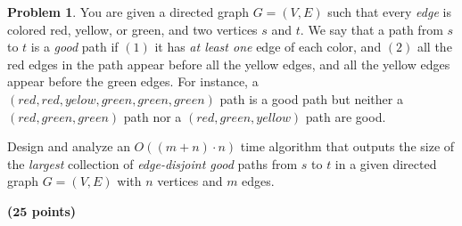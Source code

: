 \documentclass{article}
\theoremstyle{definition}
\newtheorem{problem}{Problem}
\newcommand{\grade}[1]{\hfill{\textbf{($\mathbf{#1}$ points)}}}
\begin{document}
\newpage




\newpage



\begin{problem}\label{flow}
	You are given a directed graph $G=(V,E)$ such that every \emph{edge} is colored red, yellow, or green, and two vertices $s$ and $t$. We say that a path from $s$ to $t$ 
	is a \emph{good} path if $(1)$ it has \emph{at least one} edge of each color, and $(2)$ all the red edges in the path appear before all the yellow edges, and all the yellow edges appear before the green edges. 
	For instance, a $(red,red,yelow,green,green,green)$ path is a good path but neither a $(red,green,green)$ path nor a $(red,green,yellow)$ path are good. 
	
	Design and analyze an $O((m+n) \cdot n)$ time algorithm that outputs the size of the \emph{largest} collection of \emph{edge-disjoint good} paths from $s$ to $t$ in a given directed graph $G=(V,E)$ with $n$ vertices and $m$ edges. 
	
	\grade{25}
\end{problem}
\end{document}

